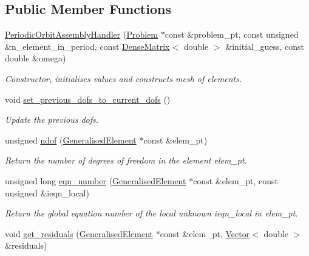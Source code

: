 \subsection*{Public Member Functions}
\begin{DoxyCompactItemize}
\item 
\hyperlink{classoomph_1_1PeriodicOrbitAssemblyHandler_abe3fe6f2f74260df121bbf115ef3a5ee}{Periodic\+Orbit\+Assembly\+Handler} (\hyperlink{classoomph_1_1Problem}{Problem} $\ast$const \&problem\+\_\+pt, const unsigned \&n\+\_\+element\+\_\+in\+\_\+period, const \hyperlink{classoomph_1_1DenseMatrix}{Dense\+Matrix}$<$ double $>$ \&initial\+\_\+guess, const double \&omega)
\begin{DoxyCompactList}\small\item\em Constructor, initialises values and constructs mesh of elements. \end{DoxyCompactList}\item 
void \hyperlink{classoomph_1_1PeriodicOrbitAssemblyHandler_ac3296942fb40f5ca642521db38d44988}{set\+\_\+previous\+\_\+dofs\+\_\+to\+\_\+current\+\_\+dofs} ()
\begin{DoxyCompactList}\small\item\em Update the previous dofs. \end{DoxyCompactList}\item 
unsigned \hyperlink{classoomph_1_1PeriodicOrbitAssemblyHandler_ab960ecaac9239cfbc47f1036893362ff}{ndof} (\hyperlink{classoomph_1_1GeneralisedElement}{Generalised\+Element} $\ast$const \&elem\+\_\+pt)
\begin{DoxyCompactList}\small\item\em Return the number of degrees of freedom in the element elem\+\_\+pt. \end{DoxyCompactList}\item 
unsigned long \hyperlink{classoomph_1_1PeriodicOrbitAssemblyHandler_ac4d1e4e7e566061c2129157c67adab5b}{eqn\+\_\+number} (\hyperlink{classoomph_1_1GeneralisedElement}{Generalised\+Element} $\ast$const \&elem\+\_\+pt, const unsigned \&ieqn\+\_\+local)
\begin{DoxyCompactList}\small\item\em Return the global equation number of the local unknown ieqn\+\_\+local in elem\+\_\+pt. \end{DoxyCompactList}\item 
void \hyperlink{classoomph_1_1PeriodicOrbitAssemblyHandler_af43abc524b34d8e8035e2c2323e2fc87}{get\+\_\+residuals} (\hyperlink{classoomph_1_1GeneralisedElement}{Generalised\+Element} $\ast$const \&elem\+\_\+pt, \hyperlink{classoomph_1_1Vector}{Vector}$<$ double $>$ \&residuals)

\end{DoxyCompactItemize}
